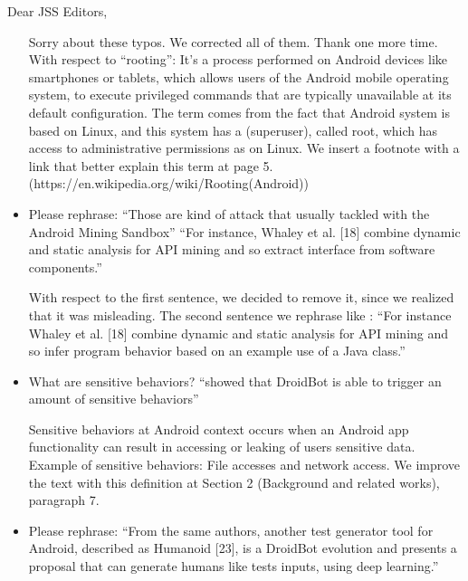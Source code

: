 \documentclass[12pt,english]{scrartcl}
\begin{document}
\begin{letter}{Dear JSS Editors,}
\begin{itemize}
\vspace{0.2cm}

{\color{blue}{\bf Answer.} Sorry about these typos. We corrected all of them. Thank one more time. With respect to ``rooting'': It's a process performed on Android devices like smartphones or tablets, which allows users of the Android mobile operating system, to execute privileged commands that are typically unavailable at its default configuration. The term comes from the fact that Android system is based on Linux, and this system has a (superuser), called root, which has access to administrative permissions as on Linux. We insert a footnote with a link that better explain this term at page 5.\newline
(https://en.wikipedia.org/wiki/Rooting(Android))
}

\vspace{0.2cm}

\item Please rephrase:
``Those are kind of attack that usually tackled with the Android Mining Sandbox''
``For instance, Whaley et al. [18] combine dynamic and static analysis for API mining and so extract interface from software components.''


\vspace{0.2cm}

{\color{blue}{\bf Answer.} With respect to the first sentence, we decided to remove it, since we realized that it was misleading. The second sentence we rephrase like : ``For instance Whaley et al. [18] combine dynamic and static analysis for API mining and so infer program behavior based on an example use of a Java class.''}

\vspace{0.2cm}

\item What are sensitive behaviors? ``showed that DroidBot is able to trigger an amount of sensitive behaviors''


\vspace{0.2cm}

{\color{blue}{\bf Answer.} Sensitive behaviors at Android context occurs when an Android app functionality can result in accessing or leaking of users sensitive data. Example of sensitive behaviors: File accesses and network access. We improve the text with this definition at Section 2 (Background and related works), paragraph 7.}

\vspace{0.2cm}

\item Please rephrase:
``From the same authors, another test generator tool for Android, described as Humanoid [23], is a DroidBot evolution and
presents a proposal that can generate humans like tests inputs, using deep learning.''



\end{itemize}
\end{letter}
\end{document}
